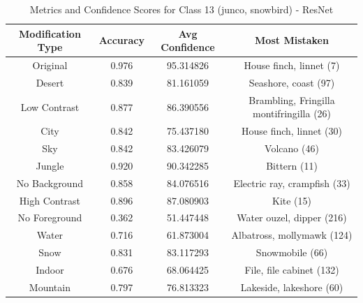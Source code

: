 \begin{table}
	\centering
	\begin{tabular}{|c|c|c|c|}
		\hline
		\textbf{Modification Type} & \textbf{Accuracy} & \textbf{Avg Confidence} & \textbf{Most Mistaken} \\
		\hline
		Original & 0.976 & 95.314826 & House finch, linnet (7) \\
		\hline
		Desert & 0.839 & 81.161059 & Seashore, coast (97) \\
		\hline
		Low Contrast & 0.877 & 86.390556 & Brambling, Fringilla montifringilla (26) \\
		\hline
		City & 0.842 & 75.437180 & House finch, linnet (30) \\
		\hline
		Sky & 0.842 & 83.426079 & Volcano (46) \\
		\hline
		Jungle & 0.920 & 90.342285 & Bittern (11) \\
		\hline
		No Background & 0.858 & 84.076516 & Electric ray, crampfish (33) \\
		\hline
		High Contrast & 0.896 & 87.080903 & Kite (15) \\
		\hline
		No Foreground & 0.362 & 51.447448 & Water ouzel, dipper (216) \\
		\hline
		Water & 0.716 & 61.873004 & Albatross, mollymawk (124) \\
		\hline
		Snow & 0.831 & 83.117293 & Snowmobile (66) \\
		\hline
		Indoor & 0.676 & 68.064425 & File, file cabinet (132) \\
		\hline
		Mountain & 0.797 & 76.813323 & Lakeside, lakeshore (60) \\
		\hline
	\end{tabular}
	\caption{Metrics and Confidence Scores for Class 13 (junco, snowbird) - ResNet}
	\label{tab:metrics_confidence_class_13_resnet}
\end{table}

